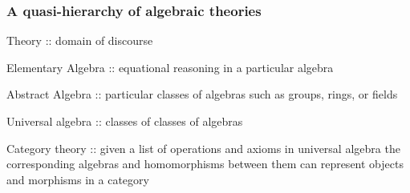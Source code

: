 \begin{frame}
\frametitle{A quasi-hierarchy of algebraic theories}
\begin{block}{}
Theory :: domain of discourse
\end{block}
\begin{block}{}
Elementary Algebra :: equational reasoning in a particular algebra
\end{block}
\begin{block}{}
Abstract Algebra :: particular classes of algebras such as groups, rings, or fields
\end{block}
\begin{block}{}
Universal algebra :: classes of classes of algebras
\end{block}
\begin{block}{}
Category theory :: given a list of operations and axioms in universal algebra the corresponding algebras and homomorphisms between them can represent objects and morphisms in a category
\end{block}
\end{frame}